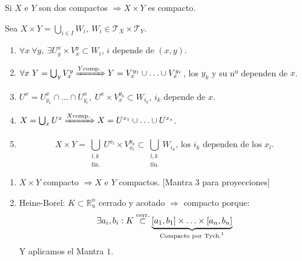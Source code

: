 \begin{theo}[de Tychonoff]
Si $X$ e $Y$ son dos compactos $\Rightarrow X \times Y$ es compacto.
\end{theo}
\begin{demo}
Sea $X \times Y = \bigcup_{i \in  I} W_i,\ W_i \in \mathcal{T}_X \times \mathcal{T}_Y$.
\begin{enumerate}
    \item $\forall x\ \forall y,\ \exists U_y^x \times V_x^y \subset W_i$, $i$ depende de $\left( x, y \right)$.
    \item $\forall x\ Y = \bigcup_{y} V_x^y \xRightarrow{Y \text{comp.}} Y = V_x^{y_1} \cup \ldots \cup V_x^{y_r}$, los $y_k$ y su nº dependen de $x$.
    \item $U^x = U_{y_1}^x \cap \ldots \cap U_{y_r}^x,\ U^x \times V_x^{y_k} \subset W_{i_k}$, $i_k$ depende de $x$.
    \item $X = \bigcup_{x} U^x \xRightarrow{X \text{comp.}} X = U^{x_1} \cup \ldots \cup U^{x_s}$.
    \item 
    \[
        X \times Y = \bigcup_{\substack{l, k\\ \text{fin.}}} U^{x_l} \times V_{x_l}^{y_k} \subset \bigcup_{\substack{l, k\\ \text{fin.}}} W_{i_k} \text{, los } i_k \text{ dependen de los } x_l. 
    \]
\end{enumerate}
\end{demo}

\begin{obs}
\begin{enumerate}
    \item $X \times Y$ compacto $\Rightarrow X$ e $Y$ compactos. [Mantra $3$ para proyecciones] 
    \item Heine-Borel: $K \subset \mathbb{R}_u^n$ cerrado y acotado $\Rightarrow$ compacto porque:
    \[
        \exists a_i, b_i: K \stackrel{\text{cerr.}}{\subset} \underbrace{\left[ a_1, b_1 \right] \times \ldots \times \left[ a_n, b_n \right]}_{\text{Compacto por Tych.\footnotemark}}  
    \]
    Y aplicamos el Mantra $1$.
\end{enumerate}
\end{obs}



